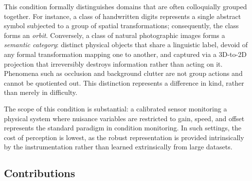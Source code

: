 \documentclass[10pt]{article}
\theoremstyle{plain}
\theoremstyle{definition}
\theoremstyle{remark}
\begin{document}
This condition formally distinguishes domains that are often colloquially grouped
together. For instance, a class of handwritten digits represents a single abstract
symbol subjected to a group of spatial transformations; consequently, the class
forms an \emph{orbit}. Conversely, a class of natural photographic images forms a
\emph{semantic category}: distinct physical objects that share a linguistic label,
devoid of any formal transformation mapping one to another, and captured via a
3D-to-2D projection that irreversibly destroys information rather than acting on it.
Phenomena such as occlusion and background clutter are not group actions and cannot
be quotiented out. This distinction represents a difference in kind, rather than
merely in difficulty.

The scope of this condition is substantial: a calibrated sensor monitoring a physical
system where nuisance variables are restricted to gain, speed, and offset represents
    the standard paradigm in condition monitoring. In such settings, the cost of perception is lowest,
    as the robust representation is provided intrinsically by
    the instrumentation rather than learned extrinsically from large datasets.

\subsection{Contributions}
\end{document}
